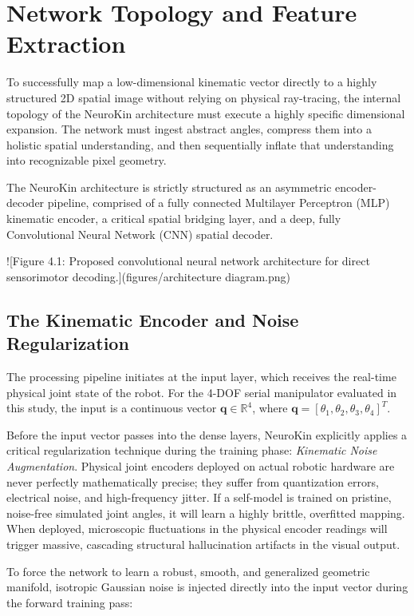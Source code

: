 \documentclass[12pt,a4paper,oneside]{report}
\begin{document}
\section{Network Topology and Feature Extraction}

To successfully map a low-dimensional kinematic vector directly to a highly structured 2D spatial image without relying on physical ray-tracing, the internal topology of the NeuroKin architecture must execute a highly specific dimensional expansion. The network must ingest abstract angles, compress them into a holistic spatial understanding, and then sequentially inflate that understanding into recognizable pixel geometry. 

The NeuroKin architecture is strictly structured as an asymmetric encoder-decoder pipeline, comprised of a fully connected Multilayer Perceptron (MLP) kinematic encoder, a critical spatial bridging layer, and a deep, fully Convolutional Neural Network (CNN) spatial decoder.

![Figure 4.1: Proposed convolutional neural network architecture for direct sensorimotor decoding.](figures/architecture diagram.png)

\subsection{The Kinematic Encoder and Noise Regularization}

The processing pipeline initiates at the input layer, which receives the real-time physical joint state of the robot. For the 4-DOF serial manipulator evaluated in this study, the input is a continuous vector $\mathbf{q} \in \mathbb{R}^4$, where $\mathbf{q} = [\theta_1, \theta_2, \theta_3, \theta_4]^T$.

Before the input vector passes into the dense layers, NeuroKin explicitly applies a critical regularization technique during the training phase: \textit{Kinematic Noise Augmentation}. Physical joint encoders deployed on actual robotic hardware are never perfectly mathematically precise; they suffer from quantization errors, electrical noise, and high-frequency jitter. If a self-model is trained on pristine, noise-free simulated joint angles, it will learn a highly brittle, overfitted mapping. When deployed, microscopic fluctuations in the physical encoder readings will trigger massive, cascading structural hallucination artifacts in the visual output.

To force the network to learn a robust, smooth, and generalized geometric manifold, isotropic Gaussian noise is injected directly into the input vector during the forward training pass:
\end{document}
